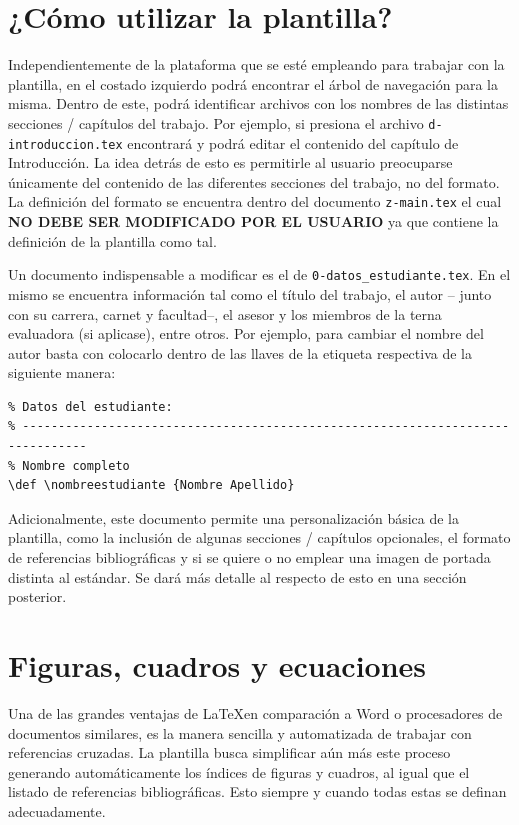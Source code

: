 \section{¿Cómo utilizar la plantilla?}

Independientemente de la plataforma que se esté empleando para trabajar con la plantilla, en el costado izquierdo podrá encontrar el árbol de navegación para la misma. Dentro de este, podrá identificar archivos con los nombres de las distintas secciones / capítulos del trabajo. Por ejemplo, si presiona el archivo \verb|d-introduccion.tex| encontrará y podrá editar el contenido del capítulo de Introducción. La idea detrás de esto es permitirle al usuario preocuparse únicamente del contenido de las diferentes secciones del trabajo, no del formato. La definición del formato se encuentra dentro del documento \verb|z-main.tex| el cual \textbf{NO DEBE SER MODIFICADO POR EL USUARIO} ya que contiene la definición de la plantilla como tal.

Un documento indispensable a modificar es el de \verb|0-datos_estudiante.tex|. En el mismo se encuentra información tal como el título del trabajo, el autor -- junto con su carrera, carnet y facultad--, el asesor y los miembros de la terna evaluadora (si aplicase), entre otros. Por ejemplo, para cambiar el nombre del autor basta con colocarlo dentro de las llaves de la etiqueta respectiva de la siguiente manera:
\begin{verbatim}
% Datos del estudiante:
% -------------------------------------------------------------------------------
% Nombre completo
\def \nombreestudiante {Nombre Apellido} 
\end{verbatim}

Adicionalmente, este documento permite una personalización básica de la plantilla, como la inclusión de algunas secciones / capítulos opcionales, el formato de referencias bibliográficas y si se quiere o no emplear una imagen de portada distinta al estándar. Se dará más detalle al respecto de esto en una sección posterior.


\section{Figuras, cuadros y ecuaciones}

Una de las grandes ventajas de \LaTeX en comparación a Word o procesadores de documentos similares, es la manera sencilla y automatizada de trabajar con referencias cruzadas. La plantilla busca simplificar aún más este proceso generando automáticamente los índices de figuras y cuadros, al igual que el listado de referencias bibliográficas. Esto siempre y cuando todas estas se definan adecuadamente. 

